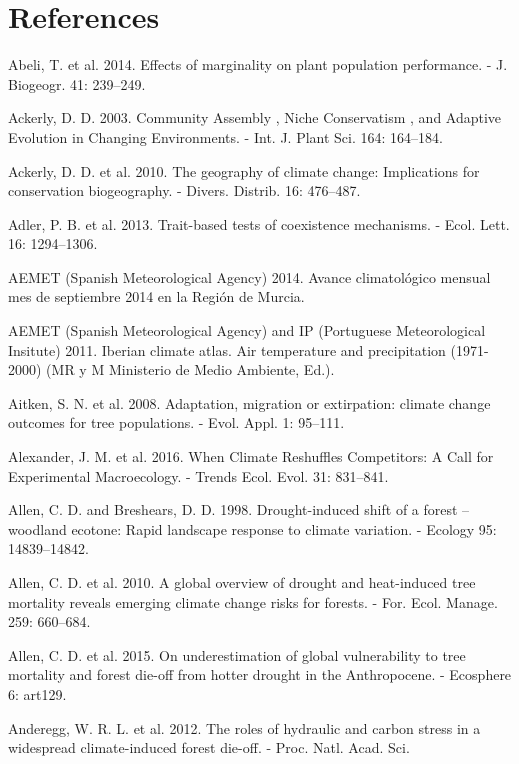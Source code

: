 \documentclass[11pt,twoside]{reedthesis}
\begin{document}
\chapter*{References}\label{references}

\setlength{\parindent}{-0.20in} \setlength{\leftskip}{0.20in}
\setlength{\parskip}{8pt}

Abeli, T. et al. 2014. Effects of marginality on plant population
performance. - J. Biogeogr. 41: 239--249.\par
Ackerly, D. D. 2003. Community Assembly , Niche Conservatism , and
Adaptive Evolution in Changing Environments. - Int. J. Plant Sci. 164:
164--184.\par
Ackerly, D. D. et al. 2010. The geography of climate change:
Implications for conservation biogeography. - Divers. Distrib. 16:
476--487.\par
Adler, P. B. et al. 2013. Trait-based tests of coexistence mechanisms. -
Ecol. Lett. 16: 1294--1306.\par
AEMET (Spanish Meteorological Agency) 2014. Avance climatológico mensual
mes de septiembre 2014 en la Región de Murcia.\par
AEMET (Spanish Meteorological Agency) and IP (Portuguese Meteorological
Insitute) 2011. Iberian climate atlas. Air temperature and precipitation
(1971-2000) (MR y M Ministerio de Medio Ambiente, Ed.).\par
Aitken, S. N. et al. 2008. Adaptation, migration or extirpation: climate
change outcomes for tree populations. - Evol. Appl. 1: 95--111.\par
Alexander, J. M. et al. 2016. When Climate Reshuffles Competitors: A
Call for Experimental Macroecology. - Trends Ecol. Evol. 31:
831--841.\par
Allen, C. D. and Breshears, D. D. 1998. Drought-induced shift of a
forest -- woodland ecotone: Rapid landscape response to climate
variation. - Ecology 95: 14839--14842.\par
Allen, C. D. et al. 2010. A global overview of drought and heat-induced
tree mortality reveals emerging climate change risks for forests. - For.
Ecol. Manage. 259: 660--684.\par
Allen, C. D. et al. 2015. On underestimation of global vulnerability to
tree mortality and forest die-off from hotter drought in the
Anthropocene. - Ecosphere 6: art129.\par
Anderegg, W. R. L. et al. 2012. The roles of hydraulic and carbon stress
in a widespread climate-induced forest die-off. - Proc. Natl. Acad. Sci.
\end{document}
